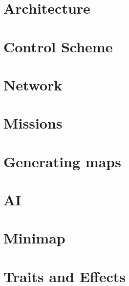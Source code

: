 \chapter{Architecture}


\chapter{Control Scheme}



\chapter{Network}


\chapter{Missions}\label{chapter:modules:missions}


\chapter{Generating maps}


\chapter{AI}


\chapter{Minimap}


\chapter{Traits and Effects}

